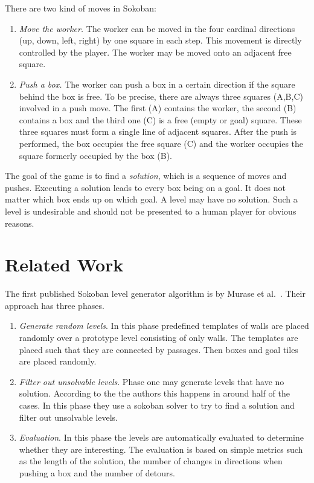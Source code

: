 \documentclass[runningheads]{llncs}
\begin{document}
There are two kind of moves in Sokoban:
\begin{enumerate}
\item \emph{Move the worker.} The worker can be moved in the four cardinal directions (up, down, left, right)
by one square in each step.
This movement is directly controlled by the player. The worker may be moved onto an adjacent free square.
\item \emph{Push a box.} The worker can push a box in a certain direction if the square behind the box is free.
To be precise, there are always three squares (A,B,C) involved in a push move. The first (A) contains the worker, the
second (B) contains a box and the third one (C) is a free (empty or goal) square. 
These three squares must form a single
line of adjacent squares. After the push is performed, the box occupies the free square (C) and the worker occupies
the square formerly occupied by the box (B).
\end{enumerate}

The goal of the game is to find a \emph{solution}, which
is a sequence of moves and pushes. Executing a solution leads to every box
being on a goal. It does not matter which box ends up on which goal.
A level may have no solution. Such a level is undesirable and should not be presented to a human player
for obvious reasons.

\section{Related Work}
\label{sec-related}
The first published Sokoban level generator algorithm is by Murase et al.~\cite{murase1996automatic}.
Their approach has three phases.
\begin{enumerate}
\item \emph{Generate random levels}. In this phase predefined templates of walls are placed randomly
over a prototype level consisting of only walls. 
The templates are placed such that they are connected by passages.
Then boxes and goal tiles are placed randomly.
\item \emph{Filter out unsolvable levels}. Phase one may generate levels that have no solution. According to the the authors this happens in around half of the cases. In this phase they use a sokoban solver to try to find a solution and filter out unsolvable levels.
\item \emph{Evaluation}. In this phase the levels are automatically evaluated to determine whether
they are interesting. The evaluation is based on simple metrics such as the length of the solution, the number of changes in directions when pushing a box and the number of detours.
\end{enumerate}
\end{document}

